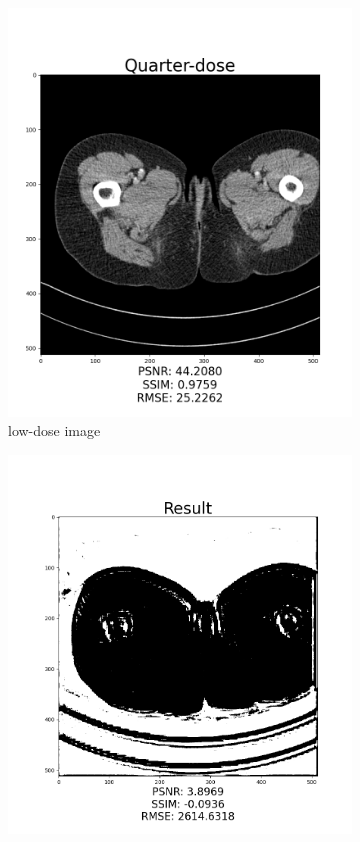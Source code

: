 \documentclass[journal]{IEEEtran}
\begin{document}
\begin{figure}
     \centering
     \begin{subfigure}[t]{0.22\textwidth}
         \centering
         \includegraphics[width=\textwidth]{ldct}
         \caption{low-dose image}
         \label{ldct}
     \end{subfigure}
     \begin{subfigure}[t]{0.22\textwidth}
         \centering
         \includegraphics[width=\textwidth]{epoch0}

\end{subfigure}
\end{figure}
\end{document}
